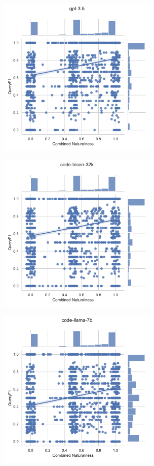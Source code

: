   \begin{figure}
    \centering
    \begin{subfigure}{.5\textwidth}
      \centering
      \includegraphics[height=3in]{figures/distribution-jointplots/jointplot-gpt-3.5-combined-nat--f1-with-distributions.pdf}
    \end{subfigure}%
    \begin{subfigure}{.5\textwidth}
      \centering
      \includegraphics[height=3in]{figures/distribution-jointplots/jointplot-code-bison-32k-combined-nat--f1-with-distributions.pdf}
    \end{subfigure}
    \begin{subfigure}{.5\textwidth}
      \centering
      \includegraphics[height=3in]{figures/distribution-jointplots/jointplot-code-llama-7b-combined-nat--f1-with-distributions.pdf}

\end{subfigure}
\end{figure}
